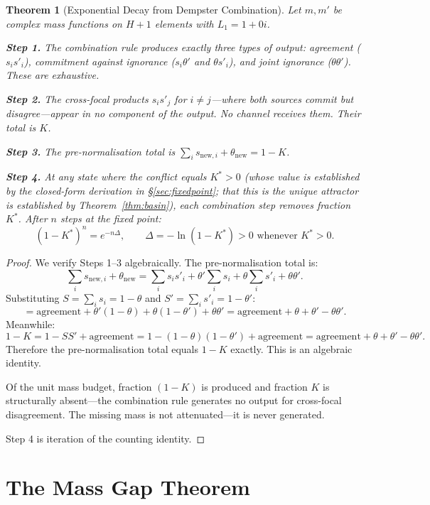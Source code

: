 \documentclass[11pt,a4paper]{article}
\newtheorem{theorem}{Theorem}[section]
\theoremstyle{definition}
\theoremstyle{remark}
\begin{document}
\begin{theorem}[Exponential Decay from Dempster Combination]\label{thm:filter}
Let $m,m'$ be complex mass functions on $H+1$ elements with $L_1=1+0i$.

\textbf{Step 1.} The combination rule produces exactly three types of output: agreement ($s_is'_i$), commitment against ignorance ($s_i\theta'$ and $\theta s'_i$), and joint ignorance ($\theta\theta'$). These are exhaustive.

\textbf{Step 2.} The cross-focal products $s_is'_j$ for $i\neq j$---where both sources commit but disagree---appear in \emph{no} component of the output. No channel receives them. Their total is $K$.

\textbf{Step 3.} The pre-normalisation total is $\sum_i s_{\mathrm{new},i}+\theta_{\mathrm{new}}=1-K$.

\textbf{Step 4.} At any state where the conflict equals $K^*>0$ (whose value is established by the closed-form derivation in \S\ref{sec:fixedpoint}; that this is the unique attractor is established by Theorem~\ref{thm:basin}), each combination step removes fraction $K^*$. After $n$ steps at the fixed point:
\begin{equation}\label{eq:decay}
(1-K^*)^n=e^{-n\Delta},\qquad\Delta=-\ln(1-K^*)>0 \text{ whenever }K^*>0.
\end{equation}
\end{theorem}

\begin{proof}
We verify Steps 1--3 algebraically. The pre-normalisation total is:
\[
\sum_i s_{\mathrm{new},i}+\theta_{\mathrm{new}}=\sum_i s_is'_i+\theta'\sum_i s_i+\theta\sum_i s'_i+\theta\theta'.
\]
Substituting $S=\sum_i s_i=1-\theta$ and $S'=\sum_i s'_i=1-\theta'$:
\[
=\text{agreement}+\theta'(1-\theta)+\theta(1-\theta')+\theta\theta'=\text{agreement}+\theta+\theta'-\theta\theta'.
\]
Meanwhile:
\[
1-K=1-SS'+\text{agreement}=1-(1-\theta)(1-\theta')+\text{agreement}=\text{agreement}+\theta+\theta'-\theta\theta'.
\]
Therefore the pre-normalisation total equals $1-K$ exactly. This is an algebraic identity.

Of the unit mass budget, fraction $(1-K)$ is produced and fraction $K$ is structurally absent---the combination rule generates no output for cross-focal disagreement. The missing mass is not attenuated---it is never generated.

Step 4 is iteration of the counting identity.
\end{proof}


\section{The Mass Gap Theorem}\label{sec:massgap}
\end{document}

